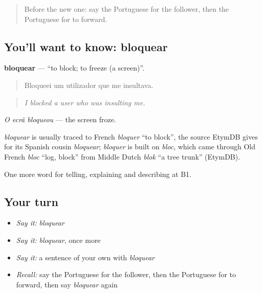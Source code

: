 \label{lesson:PT-C400-bloquear}



\begin{quote}
Before the new one: say the Portuguese for the follower, then the Portuguese for to forward.
\end{quote}

\subsection*{You'll want to know: bloquear}
\textbf{bloquear} — \textquotedblleft{}to block; to freeze (a screen)\textquotedblright{}.

\begin{quote}
Bloqueei um utilizador que me insultava.
\end{quote}

\begin{quote}
\emph{I blocked a user who was insulting me.}
\end{quote}

\emph{O ecrã bloqueou} — the screen froze.

\begin{cousinweb}
\emph{bloquear} is usually traced to French \emph{bloquer} \textquotedblleft{}to block\textquotedblright{}, the source EtymDB gives for its Spanish cousin \emph{bloquear}; \emph{bloquer} is built on \emph{bloc}, which came through Old French \emph{bloc} \textquotedblleft{}log, block\textquotedblright{} from Middle Dutch \emph{blok} \textquotedblleft{}a tree trunk\textquotedblright{} (EtymDB).
\end{cousinweb}

\begin{grammarlens}[title={What you've built}]
One more word for telling, explaining and describing at B1.
\end{grammarlens}

\subsection*{Your turn}
\begin{itemize}
\raggedright
  \item \emph{Say it:} \emph{bloquear}
  \item \emph{Say it:} \emph{bloquear}, once more
  \item \emph{Say it:} a sentence of your own with \emph{bloquear}
  \item \emph{Recall:} say the Portuguese for the follower, then the Portuguese for to forward, then say \emph{bloquear} again
\end{itemize}

